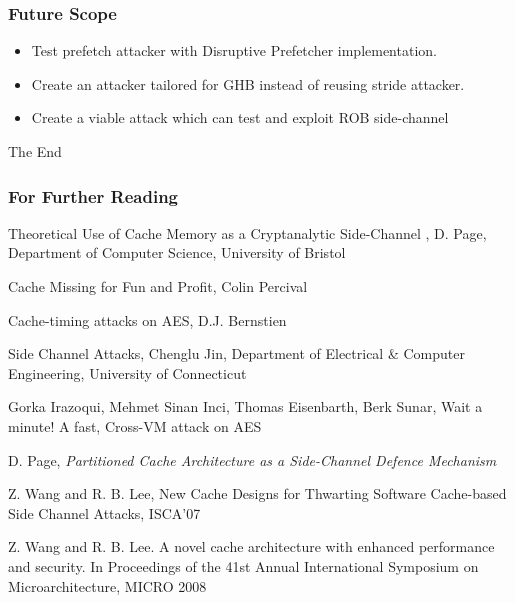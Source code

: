 \documentclass[10pt,usenames,dvipsnames]{beamer}
\begin{document}
\begin{frame}
\frametitle{Future Scope}
\begin{itemize}
        \item Test prefetch attacker with Disruptive Prefetcher implementation.
        \item Create an attacker tailored for GHB instead of reusing stride attacker.
        \item Create a viable attack which can test and exploit ROB side-channel
\end{itemize}
\end{frame}

\begin{frame}
\Huge{\centerline{The End}}
\end{frame}

\begin{frame}[allowframebreaks]
\frametitle<presentation>{For Further Reading}

\begin{thebibliography}{10}
Theoretical Use of Cache Memory as a Cryptanalytic Side-Channel
, D. Page, Department of Computer Science, University of Bristol

Cache Missing for Fun and Profit, Colin Percival

Cache-timing attacks on AES, D.J. Bernstien

Side Channel Attacks, Chenglu Jin, Department of Electrical \& Computer Engineering, University of Connecticut

Gorka Irazoqui, Mehmet Sinan Inci, Thomas Eisenbarth, Berk Sunar, Wait a minute! A fast, Cross-VM attack on AES

D. Page, {\it Partitioned Cache Architecture as a Side-Channel Defence Mechanism}

Z. Wang and R. B. Lee, New Cache Designs for Thwarting Software Cache-based Side Channel Attacks, ISCA'07

Z. Wang and R. B. Lee. A novel cache architecture with enhanced performance and security. In Proceedings of the 41st Annual Inter­national Symposium on Microarchitecture, MICRO 2008


\end{thebibliography}
\end{frame}
\end{document}

